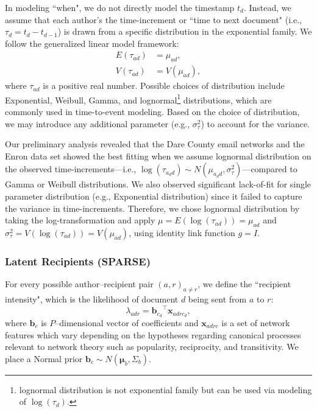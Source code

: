 \documentclass{article}
\begin{document}
In modeling ``when", we do not directly model the timestamp $t_d$. Instead, we assume that each author's the time-increment or ``time to next document" (i.e., $\tau_{d} = t_d-t_{d-1}$) is drawn from a specific distribution in the exponential family.  We follow the generalized linear model framework:
\begin{equation}
\begin{aligned}
E(\tau_{ad}) &= \mu_{ad},\\
V(\tau_{ad}) &= V(\mu_{ad}),
\end{aligned}
\end{equation}
where $\tau_{ad}$ is a positive real number. Possible choices of distribution include Exponential, Weibull, Gamma, and lognormal\footnote{lognormal distribution is not exponential family but can be used via modeling of $\log(\tau_d)$.} distributions, which are commonly used in time-to-event modeling. Based on the choice of distribution, we may introduce any additional parameter (e.g., $\sigma_\tau^2$) to account for the variance.

Our preliminary analysis revealed that the Dare County email networks and the Enron data set showed the best fitting when we assume lognormal distribution on the observed time-increments---i.e., $\log(\tau_{a_dd}) \sim N(\mu_{a_d d}, \sigma^2_\tau)$---compared to Gamma or Weibull distributions. We also observed significant lack-of-fit for single parameter distribution (e.g., Exponential distribution) since it failed to capture the variance in time-increments. Therefore, we chose lognormal distribution by taking the log-transformation and apply $\mu = E(\log(\tau_{ad})) = \mu_{ad}$ and $ \sigma_\tau^2=V(\log(\tau_{ad})) = V(\mu_{ad})$, using identity link function $g = I$. 



\subsubsection{Latent Recipients (SPARSE)}\label{subsubsec:Hypothetical Recipients}
For every possible author--recipient pair $(a,r)_{a \neq r}$, we define the ``recipient intensity", which is the likelihood of document $d$ being sent from $a$ to $r$:
\begin{equation}
\lambda_{adr} = {\boldsymbol{b}_{c_d}}^{\top}\boldsymbol{x}_{adrc_d},
\end{equation}
where $\boldsymbol{b}_c$ is $P$--dimensional vector of coefficients and $\boldsymbol{x}_{adrc}$ is a set of network features which vary depending on the hypotheses regarding canonical processes relevant to network theory such as popularity, reciprocity, and transitivity. We place a Normal prior $\boldsymbol{b}_c \sim N(\boldsymbol{\mu}_b, \Sigma_b)$.
\end{document}
